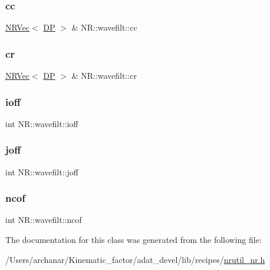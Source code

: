 \subsubsection{\texorpdfstring{cc}{cc}}
{\footnotesize\ttfamily \mbox{\hyperlink{classNR_1_1NRVec}{N\+R\+Vec}}$<$ \mbox{\hyperlink{namespaceNR_af6ff762dd605ff477b8e52387253a02a}{DP}} $>$ \& N\+R\+::wavefilt\+::cc}

\mbox{\label{classNR_1_1wavefilt_a57c5c653f23d5591340255ee4fe80c3a}} 
\subsubsection{\texorpdfstring{cr}{cr}}
{\footnotesize\ttfamily \mbox{\hyperlink{classNR_1_1NRVec}{N\+R\+Vec}}$<$ \mbox{\hyperlink{namespaceNR_af6ff762dd605ff477b8e52387253a02a}{DP}} $>$ \& N\+R\+::wavefilt\+::cr}

\mbox{\label{classNR_1_1wavefilt_acc0fda6a300680212528c1c318a3471a}} 
\subsubsection{\texorpdfstring{ioff}{ioff}}
{\footnotesize\ttfamily int N\+R\+::wavefilt\+::ioff}

\mbox{\label{classNR_1_1wavefilt_ae84da52274e02386b4a0192353ac8553}} 
\subsubsection{\texorpdfstring{joff}{joff}}
{\footnotesize\ttfamily int N\+R\+::wavefilt\+::joff}

\mbox{\label{classNR_1_1wavefilt_ae9ed314d698a843e2bbf723b2463d2e8}} 
\subsubsection{\texorpdfstring{ncof}{ncof}}
{\footnotesize\ttfamily int N\+R\+::wavefilt\+::ncof}



The documentation for this class was generated from the following file\+:\begin{DoxyCompactItemize}
\item 
/\+Users/archanar/\+Kinematic\+\_\+factor/adat\+\_\+devel/lib/recipes/\mbox{\hyperlink{lib_2recipes_2nrutil__nr_8h}{nrutil\+\_\+nr.\+h}}\end{DoxyCompactItemize}
